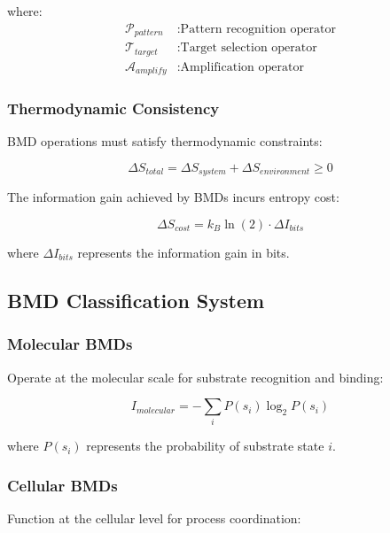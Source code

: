 \documentclass[12pt,a4paper]{article}
\begin{document}
where:
\begin{align}
\mathcal{P}_{pattern} &: \text{Pattern recognition operator} \\
\mathcal{T}_{target} &: \text{Target selection operator} \\
\mathcal{A}_{amplify} &: \text{Amplification operator}
\end{align}

\subsubsection{Thermodynamic Consistency}

BMD operations must satisfy thermodynamic constraints:

\begin{equation}
\Delta S_{total} = \Delta S_{system} + \Delta S_{environment} \geq 0
\end{equation}

The information gain achieved by BMDs incurs entropy cost:

\begin{equation}
\Delta S_{cost} = k_B \ln(2) \cdot \Delta I_{bits}
\end{equation}

where $\Delta I_{bits}$ represents the information gain in bits.

\subsection{BMD Classification System}

\subsubsection{Molecular BMDs}

Operate at the molecular scale for substrate recognition and binding:

\begin{equation}
I_{molecular} = -\sum_i P(s_i) \log_2 P(s_i)
\end{equation}

where $P(s_i)$ represents the probability of substrate state $i$.

\subsubsection{Cellular BMDs}

Function at the cellular level for process coordination:
\end{document}
